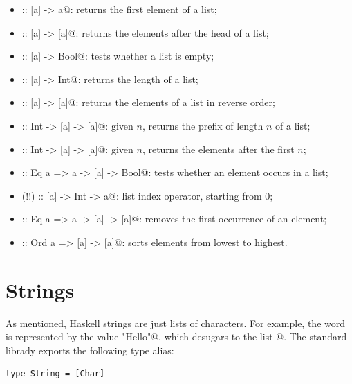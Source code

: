 \documentclass[UdineBachThesis,american,11pt,draft]{PhdThesis}
\begin{document}
  \begin{itemize}
    \item \lstinline@head :: [a] -> a@: returns the first element of a list;

    \item \lstinline@tail :: [a] -> [a]@: returns the elements after the head of
    a list;

    \item \lstinline@null :: [a] -> Bool@: tests whether a list is empty;

    \item \lstinline@length :: [a] -> Int@: returns the length of a list;

    \item \lstinline@reverse :: [a] -> [a]@: returns the elements of a list in
    reverse order;

    \item \lstinline@take :: Int -> [a] -> [a]@: given $n$, returns the prefix
    of length $n$ of a list;

    \item \lstinline@drop :: Int -> [a] -> [a]@: given $n$, returns the elements
    after the first $n$;

    \item \lstinline@elem :: Eq a => a -> [a] -> Bool@: tests whether an element
    occurs in a list;

    \item \lstinline@(!!) :: [a] -> Int -> a@: list index operator, starting
    from $0$;

    \item \lstinline@delete :: Eq a => a -> [a] -> [a]@: removes the first
    occurrence of an element;

    \item \lstinline@sort :: Ord a => [a] -> [a]@: sorts elements from lowest to
    highest.
  \end{itemize}

  \section{Strings}

  As mentioned, Haskell strings are just lists of characters. For example, the
  word \lstinline@Hello@ is represented by the value \lstinline@"Hello"@, which
  desugars to the list \lstinline@['H', 'e', 'l', 'l', 'o']@. The standard
  librady exports the following type alias:

  \begin{lstlisting}[gobble=4,basicstyle=\ttfamily\small]
    type String = [Char]
  \end{lstlisting}
\end{document}
